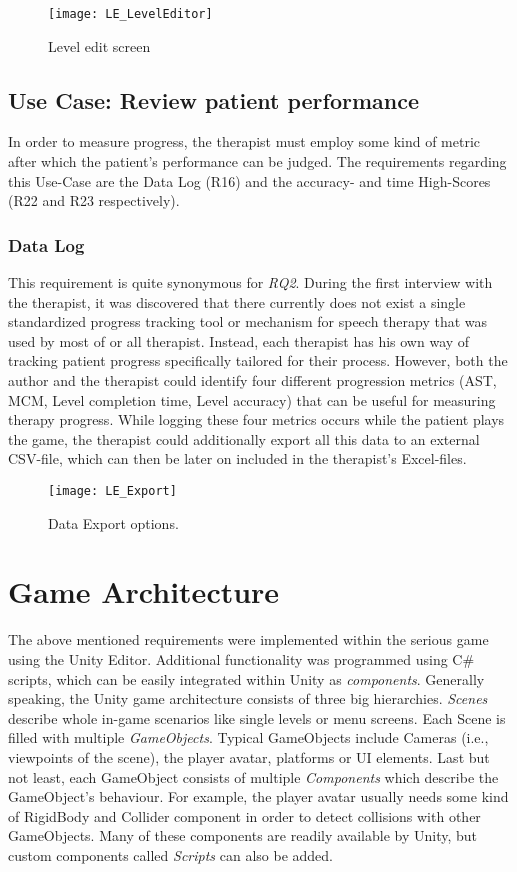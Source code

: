 \documentclass[draft,final]{vutinfth} %
\begin{document}
\begin{figure}
  \centering
  \texttt{[image: LE\_LevelEditor]}
  \caption{Level edit screen}
\end{figure}


\subsection{Use Case: Review patient performance}
In order to measure progress, the therapist must employ some kind of metric after which the patient's performance can be judged. The requirements regarding this Use-Case are the Data Log (R16) and the accuracy- and time High-Scores (R22 and R23 respectively).
\subsubsection{Data Log}
This requirement is quite synonymous for \emph{RQ2}. During the first interview with the therapist, it was discovered that there currently does not exist a single standardized progress tracking tool or mechanism for speech therapy that was used by most of or all therapist. Instead, each therapist has his own way of tracking patient progress specifically tailored for their process. However, both the author and the therapist could identify four different progression metrics (AST, MCM, Level  completion time, Level accuracy) that can be useful for measuring therapy progress. While logging these four metrics occurs while the patient plays the game, the therapist could additionally export all this data to an external CSV-file, which can then be later on included in the therapist's Excel-files.

\begin{figure}
  \centering
  \texttt{[image: LE\_Export]}
  \caption{Data Export options.}
\end{figure}

\section{Game Architecture}
The above mentioned requirements were implemented within the serious game using the Unity Editor. Additional functionality was programmed using C\# scripts, which can be easily integrated within Unity as \emph{components}. Generally speaking, the Unity game architecture consists of three big hierarchies. \emph{Scenes} describe whole in-game scenarios like single levels or menu screens. Each Scene is filled with multiple \emph{GameObjects}. Typical GameObjects include Cameras (i.e., viewpoints of the scene), the player avatar, platforms or UI elements. Last but not least, each GameObject consists of multiple \emph{Components} which describe the GameObject's behaviour. For example, the player avatar usually needs some kind of RigidBody and Collider component in order to detect collisions with other GameObjects. Many of these components are readily available by Unity, but custom components called \emph{Scripts} can also be added. \\
\end{document}
